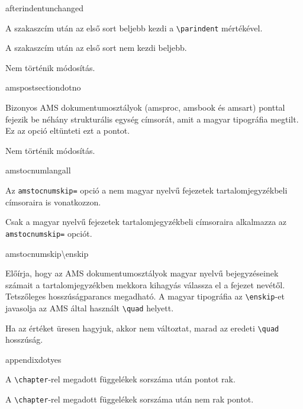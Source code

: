 \documentclass[12pt]{article}
\newcommand\param[1]{{\normalfont\slshape$\langle$#1$\rangle$}}
\begin{document}
\begin{description}
\begin{hunopt}{afterindent}{unchanged}
\item[force-yes]
A szakaszcím után az első sort beljebb kezdi a \verb|\parindent| mértékével.
\item[force-no]
A szakaszcím után az első sort nem kezdi beljebb.
\item[unchanged]
Nem történik módosítás.
\end{hunopt}

\begin{hunopt}{amspostsectiondot}{no}
\item[no]
Bizonyos AMS dokumentumosztályok (\textsf{amsproc}, \textsf{amsbook} és \textsf{amsart}) ponttal fejezik be néhány strukturális egység címsorát, amit a magyar tipográfia megtilt.
Ez az opció eltünteti ezt a pontot.
\item[unchanged]
Nem történik módosítás.
\end{hunopt}

\begin{hunopt}{amstocnumlang}{all}
\item[all]
Az \texttt{amstocnumskip=} opció a nem magyar nyelvű fejezetek tartalomjegyzékbeli címsoraira is vonatkozzon.
\item[hu]
Csak a magyar nyelvű fejezetek tartalomjegyzékbeli címsoraira alkalmazza az \texttt{amstocnumskip=} opciót.
\end{hunopt}

\begin{hunopt}{amstocnumskip}{\textbackslash enskip}
\item[\param{hosszúságparancs}]
Előírja, hogy az AMS dokumentumosztályok magyar nyelvű bejegyzéseinek számait a tartalomjegyzékben mekkora kihagyás válassza el a fejezet nevétől.
Tetszőleges hosszúságparancs megadható.
A magyar tipográfia az \verb|\enskip|-et javasolja az AMS által használt \verb|\quad| helyett.
\item[\param{üres}]
Ha az értéket üresen hagyjuk, akkor nem változtat, marad az eredeti \verb|\quad| hosszúság.
\end{hunopt}

\begin{hunopt}{appendixdot}{yes}
\item[yes]
A \verb|\chapter|-rel megadott függelékek sorszáma után pontot rak.
\item[no]
A \verb|\chapter|-rel megadott függelékek sorszáma után nem rak pontot.
\end{hunopt}


\end{description}
\end{document}
